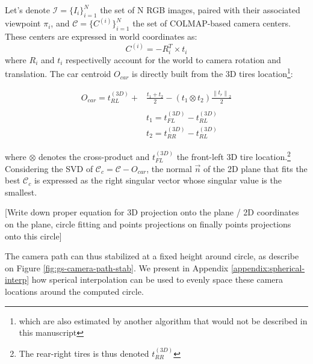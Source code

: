 Let's denote $\mathcal{I}=\{I_{i}\}_{i=1}^{N}$ the set of N RGB images, paired with their associated viewpoint $\pi_{i}$, and  $\mathcal{C} = \{C^{(i)}\}_{i=1}^{N}$ the set of COLMAP-based camera centers. These centers are expressed in world coordinates as: 
\begin{equation}
  C^{(i)}=-R_{i}^{T}\times t_{i}
\end{equation}
 where $R_{i}$ and $t_{i}$ respectivelly account for the world to camera rotation and translation. The car centroid $O_{car}$ is directly built from the 3D tires location\footnote{which are also estimated by another algorithm that would not be described in this manuscript}: 

\begin{equation}
  \begin{split}
  O_{car} = t_{RL}^{(3D)} + & \frac{t_{1}+t_{2}}{2} -(t_{1}\otimes t_{2})\frac{\left\lVert t_{r}\right\lVert_{2}}{2} \\ \\
  & t_{1} = t_{FL}^{(3D)} - t_{RL}^{(3D)} \\
  & t_{2} = t_{RR}^{(3D)} - t_{RL}^{(3D)} 
  \end{split}
  \end{equation}

where $\otimes$ denotes the cross-product and $t_{FL}^{(3D)}$ the front-left 3D tire location.\footnote{The rear-right tires is thus denoted $t_{RR}^{(3D)}$} Considering the \ac{SVD} of $\mathcal{C}_{c} = \mathcal{C} - O_{car}$, the normal $\vec{n}$ of the 2D plane that fits the best $\mathcal{C}_{c}$ is expressed as the right singular vector whose singular value is the smallest. 

[Write down proper equation for 3D projection onto the plane / 2D coordinates on the plane, circle fitting and points projections on finally points projections onto this circle]

The camera path can thus stabilized at a fixed height around circle, as describe on Figure \ref{fig:gs-camera-path-stab}. We present in Appendix \ref{appendix:spherical-interp} how sperical interpolation can be used to evenly space these camera locations around the computed circle. 


